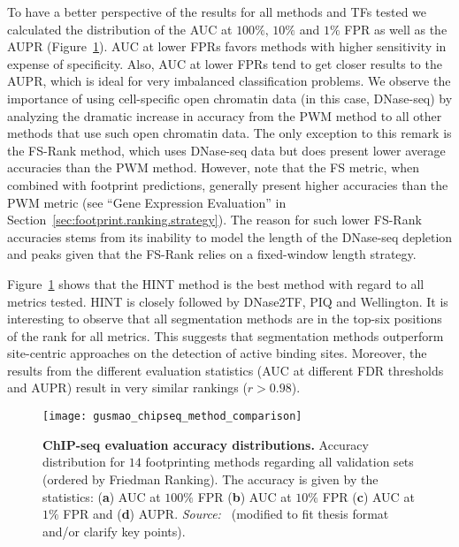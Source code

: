 To have a better perspective of the results for all methods and TFs tested we calculated the distribution of the AUC at $100\%$, $10\%$ and $1\%$ FPR as well as the AUPR (Figure~\ref{fig:gusmao_chipseq_method_comparison}). AUC at lower FPRs favors methods with higher sensitivity in expense of specificity. Also, AUC at lower FPRs tend to get closer results to the AUPR, which is ideal for very imbalanced classification problems. We observe the importance of using cell-specific open chromatin data (in this case, DNase-seq) by analyzing the dramatic increase in accuracy from the PWM method to all other methods that use such open chromatin data. The only exception to this remark is the FS-Rank method, which uses DNase-seq data but does present lower average accuracies than the PWM method. However, note that the FS metric, when combined with footprint predictions, generally present higher accuracies than the PWM metric (see ``Gene Expression Evaluation'' in Section~\ref{sec:footprint.ranking.strategy}). The reason for such lower FS-Rank accuracies stems from its inability to model the length of the DNase-seq depletion and peaks given that the FS-Rank relies on a fixed-window length strategy.

Figure~\ref{fig:gusmao_chipseq_method_comparison} shows that the HINT method is the best method with regard to all metrics tested. HINT is closely followed by DNase2TF, PIQ and Wellington. It is interesting to observe that all segmentation methods are in the top-six positions of the rank for all metrics. This suggests that segmentation methods outperform site-centric approaches on the detection of active binding sites. Moreover, the results from the different evaluation statistics (AUC at different FDR thresholds and AUPR) result in very similar rankings ($r > 0.98$).

\begin{figure}[h!]
\centering
\texttt{[image: gusmao\_chipseq\_method\_comparison]}
\caption[ChIP-seq evaluation accuracy distributions]{\textbf{ChIP-seq evaluation accuracy distributions.} Accuracy distribution for $14$ footprinting methods regarding all validation sets (ordered by Friedman Ranking). The accuracy is given by the statistics: (\textbf{a}) AUC at $100\%$ FPR (\textbf{b}) AUC at $10\%$ FPR (\textbf{c}) AUC at $1\%$ FPR and (\textbf{d}) AUPR. \emph{Source:~\cite{gusmao2016}} (modified to fit thesis format and/or clarify key points).}
\label{fig:gusmao_chipseq_method_comparison}
\end{figure}


